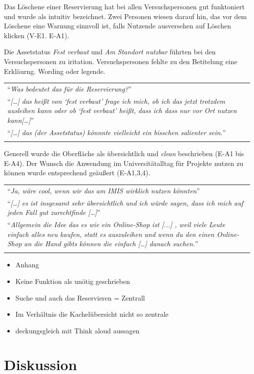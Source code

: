 Das Löschene einer Reservierung hat bei allen Versuchspersonen gut funktoniert und wurde als
intuitiv bezeichnet. Zwei Personen wiesen darauf hin, das vor dem Löschene eine Warnung sinnvoll ist,
falls Nutzende ausversehen auf Löschen klicken (V-E1. E-A1). 

Die Assetstatus \textit{Fest verbaut} und \textit{Am Standort nutzbar} führten bei den
Versuchspersonen zu iritation. Versuchspersonen fehlte zu den Betitelung eine Erkläurng.  Wording
oder legende.

\begin{longtable}{p{}} \arrayrulecolor{maincolor}\hline
  \enquote{\textit{Was bedeutet das für die Reservierung?}} \\
  \enquote{\textit{[\dots] das heißt von \enquote{fest verbaut} frage ich mich, ob ich das jetzt
  trotzdem ausleihen kann oder ob \enquote{fest verbaut} heißt, dass ich dass nur vor Ort nutzen
  kann[\dots]}} \\
  \enquote{\textit{[\dots] das (der Assetstatus) könnnte vielleicht ein bisschen salienter sein.}}
  \\
  \arrayrulecolor{maincolor}\hline
\end{longtable}

Generell wurde die Oberfläche als übersichtlich und \textit{clean} beschrieben (E-A1 bis E-A4). Der
Wunsch die Anwendung im Universitätalltag für Projekte nutzen zu können wurde entsprechend geäußert
(E-A1,3,4).

\begin{longtable}{p{}} \arrayrulecolor{maincolor}\hline
  \enquote{\textit{Ja, wäre cool, wenn wir das am IMIS wirklich nutzen könnten}}\\
  \enquote{\textit{[\dots] es ist insgesamt sehr übersichtlich und ich würde sagen, dass ich mich
  auf jeden Fall gut zurechtfinde [\dots]}} \\
  \enquote{\textit{Allgemein die Idee das es wie ein Online-Shop ist [...] , weil viele Leute
  einfach alles neu kaufen, statt es auszuleihen und wenn du den einen Online-Shop an die Hand gibts
  können die einfach [\dots] danach suchen.}} \\
  \arrayrulecolor{maincolor}\hline
\end{longtable}


\begin{itemize}
  \item Anhang
  \item Keine Funktion als unötig geschrieben
  \item Suche und auch das Reservieren = Zentrall
  \item Im Verhältnis die Kachelübersicht nicht so zentrale
  \item deckungsgleich mit Think aloud aussagen
\end{itemize}


\section{Diskussion}